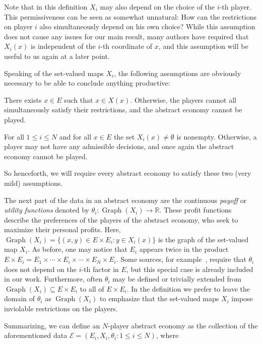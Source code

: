 \documentclass[a4paper,11pt,reqno,english]{amsart}
\theoremstyle{definition}
\newcommand\R{\mathbb R}
\begin{document}
Note that in this definition $X_i$ may also depend on the choice of the $i$-th player. This permissiveness can be seen as somewhat unnatural: How can the restrictions on player $i$ also simultaneously depend on his own choice? While this assumption does not cause any issues for our main result, many authors have required that $X_i(x)$ is independent of the $i$-th coordinate of $x$, and this assumption will be useful to us again at a later point.

Speaking of the set-valued maps $X_i$, the following assumptions are obviously necessary to be able to conclude anything productive:
\begin{compactitem}[\quad --]
	\item There exists $x\in E$ such that $x\in X(x)$. Otherwise, the players cannot all simultaneously satisfy their restrictions, and the abstract economy cannot be played.
	\item For all $1\leq i\leq N$ and for all $x\in E$ the set $X_i(x)\neq\emptyset$ is nonempty. Otherwise, a player may not have any admissible decisions, and once again the abstract economy cannot be played.
\end{compactitem}
So henceforth, we will require every abstract economy to satisfy these two (very mild) assumptions.

\medskip
The next part of the data in an abstract economy are the continuous \textit{payoff} or \textit{utility functions} denoted by $\theta_i\colon\operatorname{Graph}(X_i)\longrightarrow \R$.
These profit functions describe the preferences of the players of the abstract economy, who seek to maximize their personal profits.
Here, $\operatorname{Graph}(X_i)=\{(x,y)\in E\times E_i : y\in X_i(x)\}$ is the graph of the set-valued map $X_i$.
As before, one may notice that $E_i$ appears twice in the product $E\times E_i = E_1\times\cdots\times E_i\times\cdots\times E_N\times E_i$.
Some sources, for example~\cite{FacchineiKanzow2007}, require that $\theta_i$ does not depend on the $i$-th factor in $E$, but this special case is already included in our work.
Furthermore, often $\theta_i$ may be defined or trivially extended from $\operatorname{Graph}(X_i)\subseteq E\times E_i$ to all of $E\times E_i$.
In the definition we prefer to leave the domain of $\theta_i$ as $\operatorname{Graph}(X_i)$ to emphasize that the set-valued maps $X_i$ impose inviolable restrictions on the players.

Summarizing, we can define an $N$-player abstract economy as the collection of the aforementioned data $\mathcal{E}=(E_i,X_i,\theta_i\colon 1\leq i\leq N)$, where
\end{document}
